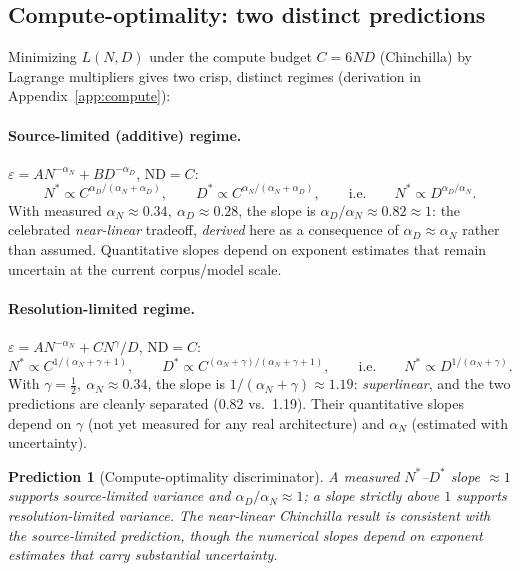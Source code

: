 \documentclass[12pt]{article}
\newcommand{\eps}{\varepsilon}
\newtheorem{prediction}[theorem]{Prediction}
\theoremstyle{remark}
\begin{document}
\subsection{Compute-optimality: two distinct predictions}
Minimizing $L(N,D)$ under the compute budget $C=6ND$ (Chinchilla) by
Lagrange multipliers gives two crisp, distinct regimes (derivation in
Appendix~\ref{app:compute}):

\paragraph{Source-limited (additive) regime.}
$\eps=A N^{-\alpha_N}+B D^{-\alpha_D}$, $\text{ND}=C$:
\begin{equation}
  N^* \propto C^{\alpha_D/(\alpha_N+\alpha_D)},\qquad
  D^* \propto C^{\alpha_N/(\alpha_N+\alpha_D)},
  \qquad\text{i.e.}\qquad
  N^* \propto D^{\alpha_D/\alpha_N}.
  \label{eq:sourceopt}
\end{equation}
With measured $\alpha_N\approx0.34,\ \alpha_D\approx0.28$, the slope is
$\alpha_D/\alpha_N\approx0.82\approx1$: the celebrated \emph{near-linear}
tradeoff, \emph{derived} here as a consequence of $\alpha_D\approx\alpha_N$
rather than assumed. Quantitative slopes depend on exponent estimates
that remain uncertain at the current corpus/model scale.

\paragraph{Resolution-limited regime.}
$\eps=A N^{-\alpha_N}+C N^{\gamma}/D$, $\text{ND}=C$:
\begin{equation}
  N^* \propto C^{1/(\alpha_N+\gamma+1)},\qquad
  D^* \propto C^{(\alpha_N+\gamma)/(\alpha_N+\gamma+1)},
  \qquad\text{i.e.}\qquad
  N^* \propto D^{1/(\alpha_N+\gamma)}.
  \label{eq:resolopt}
\end{equation}
With $\gamma=\frac12,\ \alpha_N\approx0.34$, the slope is
$1/(\alpha_N+\gamma)\approx1.19$: \emph{superlinear}, and the two
predictions are cleanly separated (0.82 vs.\ 1.19). Their quantitative
slopes depend on $\gamma$ (not yet measured for any real architecture) and
$\alpha_N$ (estimated with uncertainty).

\begin{prediction}[Compute-optimality discriminator]
\label{pred:compute}
A measured $N^*$--$D^*$ slope $\approx1$ supports source-limited variance and
$\alpha_D/\alpha_N\approx1$; a slope strictly above $1$ supports
resolution-limited variance. The near-linear Chinchilla result is consistent
with the source-limited prediction, though the numerical slopes depend on
exponent estimates that carry substantial uncertainty.
\end{prediction}
\end{document}
